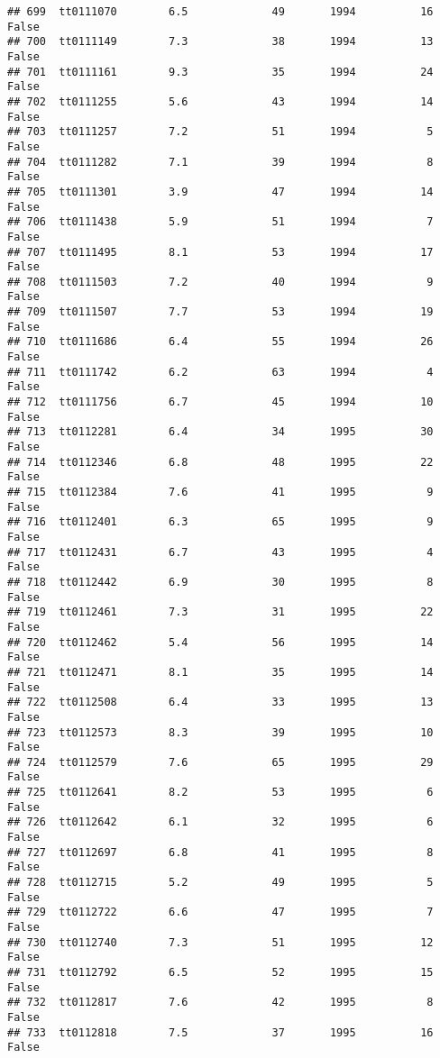 \documentclass[
]{article}
\begin{document}
\begin{verbatim}
## 699  tt0111070        6.5             49       1994          16   False
## 700  tt0111149        7.3             38       1994          13   False
## 701  tt0111161        9.3             35       1994          24   False
## 702  tt0111255        5.6             43       1994          14   False
## 703  tt0111257        7.2             51       1994           5   False
## 704  tt0111282        7.1             39       1994           8   False
## 705  tt0111301        3.9             47       1994          14   False
## 706  tt0111438        5.9             51       1994           7   False
## 707  tt0111495        8.1             53       1994          17   False
## 708  tt0111503        7.2             40       1994           9   False
## 709  tt0111507        7.7             53       1994          19   False
## 710  tt0111686        6.4             55       1994          26   False
## 711  tt0111742        6.2             63       1994           4   False
## 712  tt0111756        6.7             45       1994          10   False
## 713  tt0112281        6.4             34       1995          30   False
## 714  tt0112346        6.8             48       1995          22   False
## 715  tt0112384        7.6             41       1995           9   False
## 716  tt0112401        6.3             65       1995           9   False
## 717  tt0112431        6.7             43       1995           4   False
## 718  tt0112442        6.9             30       1995           8   False
## 719  tt0112461        7.3             31       1995          22   False
## 720  tt0112462        5.4             56       1995          14   False
## 721  tt0112471        8.1             35       1995          14   False
## 722  tt0112508        6.4             33       1995          13   False
## 723  tt0112573        8.3             39       1995          10   False
## 724  tt0112579        7.6             65       1995          29   False
## 725  tt0112641        8.2             53       1995           6   False
## 726  tt0112642        6.1             32       1995           6   False
## 727  tt0112697        6.8             41       1995           8   False
## 728  tt0112715        5.2             49       1995           5   False
## 729  tt0112722        6.6             47       1995           7   False
## 730  tt0112740        7.3             51       1995          12   False
## 731  tt0112792        6.5             52       1995          15   False
## 732  tt0112817        7.6             42       1995           8   False
## 733  tt0112818        7.5             37       1995          16   False

\end{verbatim}
\end{document}
